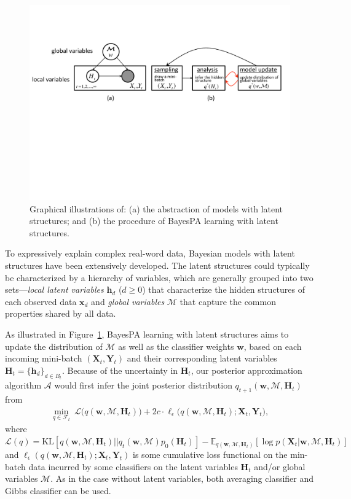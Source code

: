 \documentclass[twoside,11pt]{article}
\newcommand{\xv}{\bm{x}}
\newcommand{\Xv}{\bm{X}}
\newcommand{\Yv}{\bm{Y}}
\newcommand{\hv}{\bm{h}}
\newcommand{\Hv}{\bm{H}}
\newcommand{\algo}{\mathcal{A}}
\newcommand{\wv}{\bm{w}}
\newcommand{\Mv}{\bm{\mathcal{M}}}
\begin{document}
\begin{figure}
\begin{center}
\includegraphics[width=\textwidth]{graph.pdf}
\end{center}\vspace{-.4cm}
\caption{Graphical illustrations of: (a) the abstraction of models with latent structures; and (b) the procedure of BayesPA learning with latent structures.}\label{fig:LatentBayesPA}\vspace{-.4cm}
\end{figure}

To expressively explain complex real-word data, Bayesian models with latent structures have been extensively developed. The latent structures could typically be characterized by a hierarchy of  variables, which are generally grouped into two sets---\emph{local latent variables} $\hv_d$ ($d \geq 0$) that characterize the hidden structures of each observed data $\xv_d$ and \emph{global variables} $\Mv$ that capture the common properties shared by all data.

As illustrated in Figure~\ref{fig:LatentBayesPA}, BayesPA learning with latent structures aims to update the distribution of $\Mv$ as well as the classifier weights $\wv$, based on each incoming mini-batch $(\Xv_t, \Yv_t)$ and their corresponding latent variables $\Hv_t = \{\hv_d\}_{d \in B_t}$. Because of the uncertainty in $\Hv_t$, our posterior approximation algorithm $\algo$ would first infer the joint posterior distribution $q_{t+1}(\wv, \Mv, \Hv_t)$ from
\begin{eqnarray}\label{eq:bayespa_latent}
\underset{q \in \mathcal{F}_t}{\operatorname{min}}{~\mathcal{L}\Big( q(\wv, \Mv, \Hv_t) \Big) + 2 c \cdot \ell_\epsilon\Big( q(\wv, \Mv, \Hv_t); \Xv_t, \Yv_t \Big)},
\end{eqnarray}
where $\mathcal{L}(q) =  \text{KL}[q(\wv, \Mv, \Hv_t) ||  q_t(\wv, \Mv) p_0(\Hv_t)] -\mathbb{E}_{q(\wv, \Mv, \Hv_t)}[\log p(\Xv_t | \wv,  \Mv, \Hv_t)]$ and $\ell_\epsilon(q(\wv, \Mv, \Hv_t); \Xv_t, \Yv_t)$ is some cumulative loss functional on the min-batch data incurred by some classifiers on the latent variables $\Hv_t$ and/or global variables $\Mv$. As in the case without latent variables, both averaging classifier and Gibbs classifier can be used.
\end{document}
